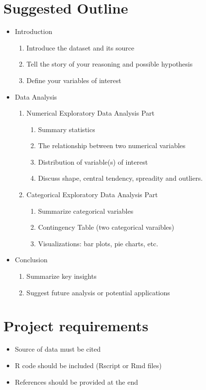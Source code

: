 \documentclass[12pt]{article}
\begin{document}
\section*{Suggested Outline}
\begin{itemize}
    \item Introduction
    \begin{enumerate}
        \item Introduce the dataset and its source
        \item Tell the story of your reasoning and possible hypothesis
        \item Define your variables of interest
    \end{enumerate}
    \item Data Analysis
    \begin{enumerate}
        \item Numerical Exploratory Data Analysis Part
        \begin{enumerate}
            \item Summary statistics 
            \item The relationship between two numerical variables 
            \item Distribution of variable(s) of interest
            \item Discuss shape, central tendency, spreadity and outliers. 
        \end{enumerate}
        \item Categorical Exploratory Data Analysis Part
        \begin{enumerate}
            \item Summarize categorical variables
            \item Contingency Table (two categorical varaibles)
            \item Visualizations: bar plots, pie charts, etc.
        \end{enumerate} 
    \end{enumerate}
    \item Conclusion
        \begin{enumerate}
            \item Summarize key insights
            \item Suggest future analysis or potential applications
        \end{enumerate} 
\end{itemize}

\section*{Project requirements}
\begin{itemize}
    \item Source of data must be cited
    \item R code should be included (Rscript or Rmd files)
    \item References should be provided at the end
\end{itemize}
\end{document}
